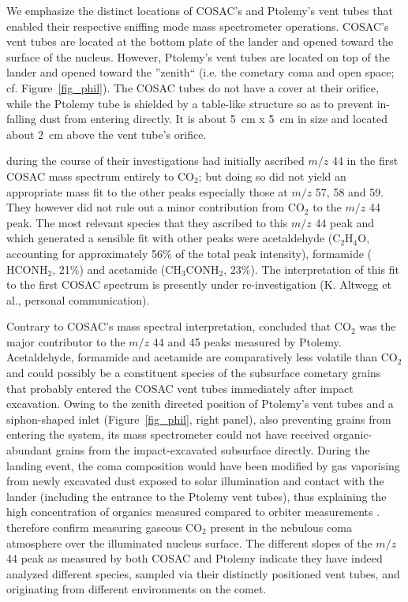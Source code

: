 \documentclass{aa}
\begin{document}
We emphasize the distinct locations of COSAC's and Ptolemy's vent tubes 
that enabled their respective sniffing mode mass spectrometer operations. COSAC's vent 
tubes are located at the bottom plate of the lander and opened toward the surface 
of the nucleus. However, Ptolemy's vent tubes are located on top of the lander and opened  
toward the ''zenith`` (i.e. the cometary coma and open space;  cf. Figure~\ref{fig_phil}).
The COSAC tubes do not have a cover at their orifice, while the Ptolemy tube is
shielded by a table-like structure so as to prevent in-falling dust from entering directly.
It is  about 5~cm x 5~cm in size and located about 2~cm above the vent tube's orifice.

\citet{goesmann2015} during the course 
of their investigations had initially ascribed $m/z$ 44 in the first COSAC mass spectrum entirely to 
$\mathrm{CO_2}$; but doing so did not yield an appropriate mass fit to the other peaks especially 
those at $m/z$ 57, 58 and 59. They however did not rule out a minor contribution from $\mathrm{CO_2}$ 
to the $m/z$ 44 peak. The  most relevant species that they ascribed to this $m/z$ 44 peak and which 
generated a sensible fit with other peaks were acetaldehyde ($\mathrm{C_2H_4O}$, 
 accounting for approximately 56\% of the total peak intensity), 
 formamide ($\mathrm{HCONH_2}$, 21\%) 
and acetamide ($\mathrm{CH_3CONH_2}$, 23\%). 
 The interpretation of this fit to the first COSAC spectrum is presently under 
re-investigation (K. Altwegg et al., personal communication).

Contrary to COSAC's mass 
spectral interpretation, \citet{wright2015} concluded that $\mathrm{CO_2}$ was the major contributor to
the $m/z$ 44  and 45 peaks measured by Ptolemy.  Acetaldehyde, formamide and acetamide are comparatively 
less volatile than $\mathrm{CO_2}$
and could possibly be a constituent species of the subsurface cometary grains that probably entered 
the COSAC vent tubes immediately after impact excavation. Owing to the zenith directed 
position of Ptolemy's vent tubes and a siphon-shaped inlet (Figure~\ref{fig_phil}, right panel), also preventing grains from entering the system, 
its mass spectrometer could not have received organic-abundant 
grains from the impact-excavated subsurface directly. 
During the landing event, the coma composition would have been modified by gas vaporising from newly 
excavated dust exposed to solar illumination and contact with the lander (including the entrance to 
the Ptolemy vent tubes), thus explaining the high concentration of organics measured compared to orbiter measurements \citep{haessig2015}.
\citet{wright2015} therefore confirm measuring 
gaseous $\mathrm{CO_2}$ present in the nebulous coma atmosphere over the illuminated nucleus surface. The 
different slopes of the $m/z$ 44 peak as measured by both COSAC and Ptolemy indicate they have 
indeed analyzed different species, sampled via their distinctly positioned vent tubes, and 
originating from different environments on the comet.
\end{document}
